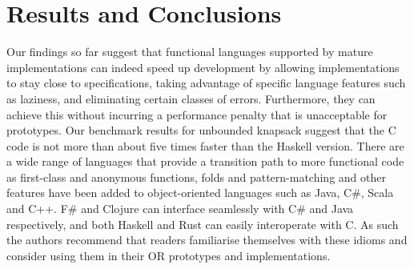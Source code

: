 \section{Results and Conclusions}

Our findings so far suggest that functional languages supported by mature
implementations can indeed speed up development by allowing implementations to
stay close to specifications, taking advantage of specific language features
such as laziness, and eliminating certain classes of errors. Furthermore, they
can achieve this without incurring
a performance penalty that is unacceptable for prototypes. Our
benchmark results for unbounded knapsack suggest that the C
code is not more than about five times faster than the Haskell version.
There are a wide range of languages that provide a transition path to more functional code as first-class and anonymous functions, folds and pattern-matching and other features have been added to object-oriented languages such as Java, C\#, Scala and C++. F\# and Clojure can interface seamlessly with C\# and Java respectively, and both Haskell and Rust can easily interoperate with C. As such the authors recommend that readers familiarise themselves with these idioms and consider using them in their OR prototypes and implementations.
